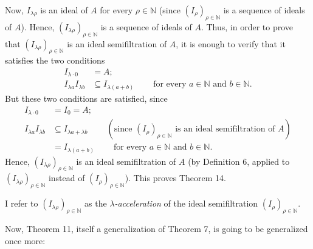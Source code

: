 \documentclass[12pt,final,notitlepage,onecolumn]{article}%
\begin{document}
Now, $I_{\lambda\rho}$ is an ideal of $A$ for every $\rho\in\mathbb{N}$ (since
$\left(  I_{\rho}\right)  _{\rho\in\mathbb{N}}$ is a sequence of ideals of
$A$). Hence, $\left(  I_{\lambda\rho}\right)  _{\rho\in\mathbb{N}}$ is a
sequence of ideals of $A$. Thus, in order to prove that $\left(
I_{\lambda\rho}\right)  _{\rho\in\mathbb{N}}$ is an ideal semifiltration of
$A$, it is enough to verify that it satisfies the two conditions%
\begin{align*}
I_{\lambda\cdot0}  &  =A;\\
I_{\lambda a}I_{\lambda b}  &  \subseteq I_{\lambda\left(  a+b\right)
}\ \ \ \ \ \ \ \ \ \ \text{for every }a\in\mathbb{N}\text{ and }b\in
\mathbb{N}.
\end{align*}
But these two conditions are satisfied, since%
\begin{align*}
I_{\lambda\cdot0}  &  =I_{0}=A;\\
I_{\lambda a}I_{\lambda b}  &  \subseteq I_{\lambda a+\lambda b}%
\ \ \ \ \ \ \ \ \ \ \left(  \text{since }\left(  I_{\rho}\right)  _{\rho
\in\mathbb{N}}\text{ is an ideal semifiltration of }A\right) \\
&  =I_{\lambda\left(  a+b\right)  }\ \ \ \ \ \ \ \ \ \ \text{for every }%
a\in\mathbb{N}\text{ and }b\in\mathbb{N}.
\end{align*}
Hence, $\left(  I_{\lambda\rho}\right)  _{\rho\in\mathbb{N}}$ is an ideal
semifiltration of $A$ (by Definition 6, applied to $\left(  I_{\lambda\rho
}\right)  _{\rho\in\mathbb{N}}$ instead of $\left(  I_{\rho}\right)  _{\rho
\in\mathbb{N}}$). This proves Theorem 14.

I refer to $\left(  I_{\lambda\rho}\right)  _{\rho\in\mathbb{N}}$ as the
$\lambda$\textit{-acceleration} of the ideal semifiltration $\left(  I_{\rho
}\right)  _{\rho\in\mathbb{N}}$.

Now, Theorem 11, itself a generalization of Theorem 7, is going to be
generalized once more:
\end{document}
